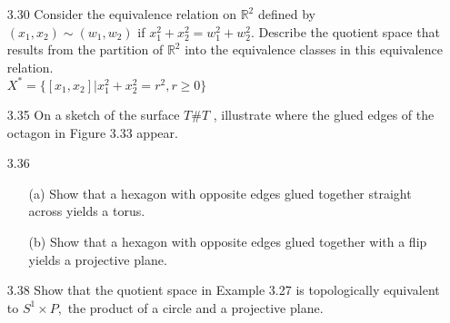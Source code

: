 \documentclass[12pt]{article}
\begin{document}
\begin{enumerate}
	\item[3.30] Consider the equivalence relation on $\mathbb { R } ^ { 2 }$ defined by $\left( x _ { 1 } , x _ { 2 } \right) \sim \left( w _ { 1 } , w _ { 2 } \right)$ if $x _ { 1 } ^ { 2 } + x _ { 2 } ^ { 2 } = w _ { 1 } ^ { 2 } + w _ { 2 } ^ { 2 } .$ Describe the quotient space that results from the partition of $\mathbb { R } ^ { 2 }$ into the equivalence classes in this equivalence relation.\\
		$ X^* = \{[x_1,x_2]|x_1^2+x_2^2=r^2,r\geq0\} $
	\item[3.35] On a sketch of the surface $T \# T$ , illustrate where the glued edges of the octagon in Figure 3.33 appear.

	\item[3.36] \begin{enumerate}
		\item[(a)] Show that a hexagon with opposite edges glued together straight across yields a torus.
			
		\item[(b)]Show that a hexagon with opposite edges glued together with a flip yields	a projective plane.
		
	\end{enumerate}
	
	\item[3.38] Show that the quotient space in Example 3.27 is topologically equivalent to
	$S ^ { 1 } \times P ,$ the product of a circle and a projective plane.

\end{enumerate}
 
\end{document}
